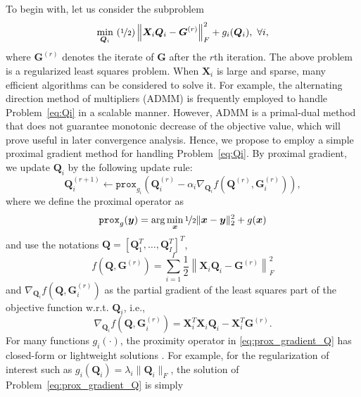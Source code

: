 \documentclass[10pt,journal]{IEEEtran}
\newcommand{\G}{\boldsymbol{G}}
\newcommand{\Q}{\boldsymbol{Q}}
\newcommand{\X}{\boldsymbol{X}}
\begin{document}
To begin with, let us consider the subproblem
\begin{equation}\label{eq:Qi}
\min_{{\bm Q}_i}~(\nicefrac{1}{2})\left\|{\bm X}_i{\bm Q}_i-{\bm G}^{(r)}\right\|_F^2+ g_i(\Q_i),~\forall i,
\end{equation}
where $\G^{(r)}$ denotes the iterate of $\G$ after the $r$th iteration.
The above problem is a regularized least squares problem. When $\X_i$ is large and sparse,
many efficient algorithms can be considered to solve it. 
For example, the alternating direction method of multipliers (ADMM) \cite{Boyd11} is frequently employed to handle Problem~\eqref{eq:Qi} in a scalable manner.
However, ADMM is a primal-dual method that does not guarantee monotonic decrease of the objective value, which will prove useful in later convergence analysis.
Hence, we propose to employ a simple proximal gradient method for handling Problem~\eqref{eq:Qi}. By proximal gradient, we update $\Q_i$ by the following update rule:
\begin{equation}\label{eq:prox_gradient_Q}
        {\bm Q}_i^{(r+1)} \leftarrow \texttt{prox}_{g_i}\left(\Q_i^{(r)}-\alpha_i \nabla_{\Q_i} f\left(\Q^{(r)},\G_i^{(r)}\right)\right),
\end{equation}
where we define the proximal operator as
\[\texttt{prox}_g({\bm y}) =\arg\min_{\bm x}\nicefrac{1}{2}\|{\bm x}-{\bm y}\|_2^2 + g({\bm x})\]
and use the notations $\Q=[\Q_1^T,\ldots,\Q_I^T]^T$,
\[f(\Q,\G^{(r)}) = \sum_{i=1}^I\frac{1}{2}\left\|{\bm X}_i{\bm Q}_i-{\bm G}^{(r)}\right\|_F^2\]
and $\nabla_{\Q_i} f(\Q,\G_i^{(r)})$ as the partial gradient of the least squares part of the objective function w.r.t. $\Q_i$, i.e.,
\begin{equation}\label{eq:grad_Q}
 \nabla_{\Q_i} f\left(\Q,\G_i^{(r)}\right)={\bm X}_i^T{\bm X}_i{\bm Q}_i- {\bm X}_i^T{\bm G}^{(r)}.
\end{equation}
For many functions $g_i(\cdot)$, the proximity operator in \eqref{eq:prox_gradient_Q} has closed-form or lightweight solutions \cite{parikh2013proximal}.
For example, for the regularization of interest such as $g_i(\Q_i)=\lambda_i\|\Q_i\|_{F}$, the solution of Problem~\eqref{eq:prox_gradient_Q} is simply
\end{document}
